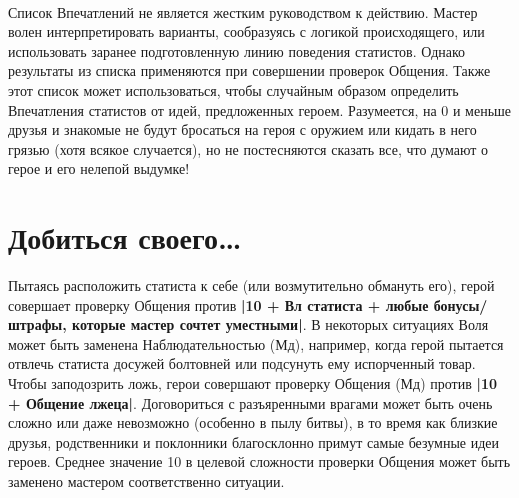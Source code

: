 \paragraph{}
Список Впечатлений не является жестким руководством к действию. Мастер волен интерпретировать варианты, сообразуясь с логикой происходящего, или использовать заранее подготовленную линию поведения статистов. Однако результаты из списка применяются при совершении проверок Общения.
\newline
Также этот список может использоваться, чтобы случайным образом определить Впечатления статистов от идей, предложенных героем. Разумеется, на 0 и меньше друзья и знакомые не будут бросаться на героя с оружием или кидать в него грязью (хотя всякое случается), но не постесняются сказать все, что думают о герое и его нелепой выдумке!
\section{Добиться своего…}
Пытаясь расположить статиста к себе (или возмутительно обмануть его), герой совершает проверку Общения против \textbf{|10 + Вл статиста + любые бонусы/штрафы, которые мастер сочтет уместными|}. В некоторых ситуациях Воля может быть заменена Наблюдательностью (Мд), например, когда герой пытается отвлечь статиста досужей болтовней или подсунуть ему испорченный товар. Чтобы заподозрить ложь, герои совершают проверку Общения (Мд) против \textbf{|10 + Общение лжеца|}. Договориться с разъяренными врагами может быть очень сложно или даже невозможно (особенно в пылу битвы), в то время как близкие друзья, родственники и поклонники благосклонно примут самые безумные идеи героев. Среднее значение 10 в целевой сложности проверки Общения может быть заменено мастером соответственно ситуации.

